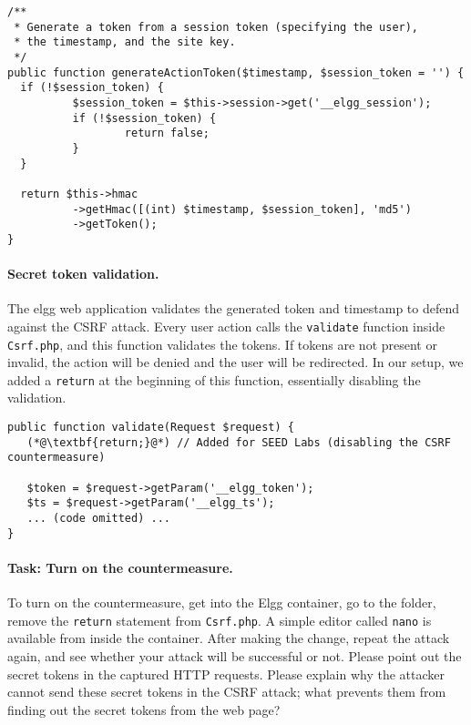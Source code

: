 \begin{lstlisting}
/**
 * Generate a token from a session token (specifying the user), 
 * the timestamp, and the site key.
 */
public function generateActionToken($timestamp, $session_token = '') {
  if (!$session_token) {
          $session_token = $this->session->get('__elgg_session');
          if (!$session_token) {
                  return false;
          }
  }

  return $this->hmac
          ->getHmac([(int) $timestamp, $session_token], 'md5')
          ->getToken();
}
\end{lstlisting}


\paragraph{Secret token validation.}
The elgg web application validates the generated token and timestamp to
defend against the CSRF attack.  Every user action calls the 
\texttt{validate} function inside \texttt{Csrf.php}, and this function validates the tokens.
If tokens are not present or invalid, the action will be denied and the
user will be redirected. In our setup, we added 
a \texttt{return} at the beginning of this function, essentially
disabling the validation.

\begin{lstlisting}
public function validate(Request $request) {
   (*@\textbf{return;}@*) // Added for SEED Labs (disabling the CSRF countermeasure)

   $token = $request->getParam('__elgg_token');
   $ts = $request->getParam('__elgg_ts');
   ... (code omitted) ...
}
\end{lstlisting}



\paragraph{Task: Turn on the countermeasure.}
To turn on the countermeasure, get into the Elgg container, 
go to the  
folder, remove the \texttt{return} statement from \texttt{Csrf.php}.
A simple editor called \texttt{nano} is available from inside the 
container.  After making the change, 
repeat the attack again, and see whether your attack will
be successful or not. 
Please point out the secret tokens in the captured HTTP requests.
Please explain why
the attacker cannot send these secret tokens in the CSRF attack; what
prevents them from finding out the secret tokens from the web page?   

